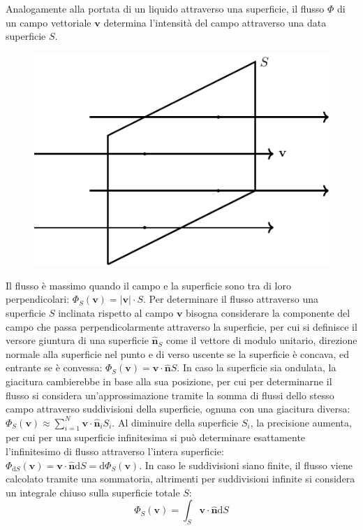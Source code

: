 \documentclass{article}
\newcommand{\vect}[1]{\boldsymbol{\mathbf{#1}}}
\newcommand{\df}{\mathrm{d}}
\numberwithin{equation}{subsection}
\begin{document}
Analogamente alla portata di un liquido attraverso una superficie, il flusso $\Phi$ di un campo vettoriale $\vect{v}$ determina l'intensità del campo attraverso una data superficie $S$. 
\begin{figure}[H]%
    \centering
    \includegraphics{flusso.pdf}
    \label{fig:flusso}
\end{figure}
Il flusso è massimo quando il campo e la superficie sono tra di loro perpendicolari: $\Phi_S(\vect{v})=|\vect{v}|\cdot S$. Per determinare il flusso attraverso una superficie $S$ 
inclinata rispetto al campo $\vect{v}$ bisogna considerare la componente del campo che passa perpendicolarmente attraverso la superficie, per cui si definisce il versore 
giuntura di una superficie $\hat{\vect{n}}_S$ come il vettore di modulo unitario, direzione normale alla superficie nel punto e di verso uscente se la superficie è concava, ed 
entrante se è convessa: $\Phi_S(\vect{v})=\vect{v}\cdot\hat{\vect{n}}S$. 
In caso la superficie sia ondulata, la giacitura cambierebbe in base alla sua posizione, per cui per determinarne il flusso si considera un'approssimazione tramite la somma 
di flussi dello stesso campo attraverso suddivisioni della superficie, ognuna con una giacitura diversa: 
$\Phi_S(\vect{v})\approx\sum_{i=1}^N\vect{v}\cdot\hat{\vect{n}}_iS_i$. Al diminuire della superficie $S_i$, la precisione aumenta, per cui per una superficie infinitesima si può 
determinare esattamente l'infinitesimo di flusso attraverso l'intera superficie: $\Phi_{\df S}(\vect{v})=\vect{v}\cdot\hat{\vect{n}}\df S=\df\Phi_{S}(\vect{v})$. In caso le suddivisioni 
siano finite, il flusso viene calcolato tramite una sommatoria, altrimenti per suddivisioni infinite si considera un integrale chiuso sulla superficie totale $S$:
\begin{equation}
    \displaystyle\Phi_S(\vect{v})=\int_{S}\vect{v}\cdot\hat{\vect{n}}\df S
\end{equation}
\end{document}
